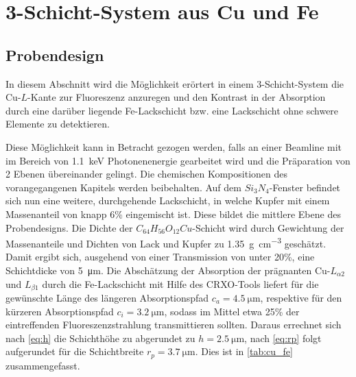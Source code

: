 \section{3-Schicht-System aus Cu und Fe}
\subsection{Probendesign}
In diesem Abschnitt wird die Möglichkeit erörtert in einem 3-Schicht-System die Cu-$L$-Kante zur Fluoreszenz anzuregen und den Kontrast in der Absorption durch eine darüber liegende Fe-Lackschicht bzw. eine Lackschicht ohne schwere Elemente zu detektieren.

Diese Möglichkeit kann in Betracht gezogen werden, falls an einer Beamline mit im Bereich von \SI{1.1}{\kilo\electronvolt} Photonenenergie gearbeitet wird und die Präparation von 2 Ebenen übereinander gelingt. \newline
Die chemischen Kompositionen des vorangegangenen Kapitels werden beibehalten. Auf dem $Si_3N_4$-Fenster befindet sich nun eine weitere, durchgehende Lackschicht, in welche Kupfer mit einem Massenanteil von knapp 6\% eingemischt ist. Diese bildet die mittlere Ebene des Probendesigns. Die Dichte der $C_{64}H_{56}O_{12}Cu$-Schicht wird durch Gewichtung der Massenanteile und Dichten von Lack und Kupfer zu \SI{1.35}{\gram\per\cubic\centi\meter} geschätzt. Damit ergibt sich, ausgehend von einer Transmission von unter 20\%, eine Schichtdicke von \SI{5}{\micro\meter}. Die Abschätzung der Absorption der prägnanten Cu-$L_{{\alpha}2}$ und $L_{{\beta}1}$ durch die Fe-Lackschicht mit Hilfe des CRXO-Tools liefert für die gewünschte Länge des längeren Absorptionspfad $c_a = \SI{4.5}{\micro\meter}$, respektive für den kürzeren Absorptionspfad $c_i = \SI{3.2}{\micro\meter}$, sodass im Mittel etwa 25\% der eintreffenden Fluoreszenzstrahlung transmittieren sollten. Daraus errechnet sich nach \cref{eq:h} die Schichthöhe zu abgerundet zu $h = \SI{2.5}{\micro\meter}$, nach \cref{eq:rp} folgt aufgerundet für die Schichtbreite $r_p = \SI{3.7}{\micro\meter}$. Dies ist in \cref{tab:cu_fe} zusammengefasst.

